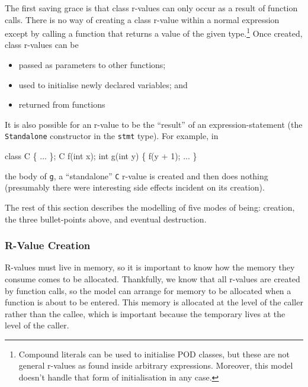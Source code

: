 \documentclass[11pt]{article}
\begin{document}
The first saving grace is that class r-values can only occur as a
result of function calls.  There is no way of creating a class r-value
within a normal expression except by calling a function that returns a
value of the given type.\footnote{Compound literals can be used to
  initialise POD classes, but these are not general r-values as found
  inside arbitrary expressions.  Moreover, this model doesn't handle
  that form of initialisation in any case.}  Once created, class
r-values can be
\begin{itemize}
\item passed as parameters to other functions;
\item used to initialise newly declared variables; and
\item returned from functions
\end{itemize}
It is also possible for an r-value to be the ``result'' of an
expression-statement (the \texttt{Standalone} constructor in the
\texttt{stmt} type).  For example, in
\begin{stdrule}
   class C \{ ... \};
   C f(int x);
   int g(int y) \{ f(y + 1); ... \}
\end{stdrule}
the body of \texttt{g}, a ``standalone'' \texttt{C} r-value is created
and then does nothing (presumably there were interesting side effects
incident on its creation).

The rest of this section describes the modelling of five modes of being:
creation, the three bullet-points above, and eventual destruction.

\subsubsection{R-Value Creation}
\label{sec:r-value-creation}

R-values must live in memory, so it is important to know how the
memory they consume comes to be allocated.  Thankfully, we know that
all r-values are created by function calls, so the model can arrange
for memory to be allocated when a function is about to be entered.
This memory is allocated at the level of the caller rather than the
callee, which is important because the temporary lives at the level of
the caller.
\end{document}
